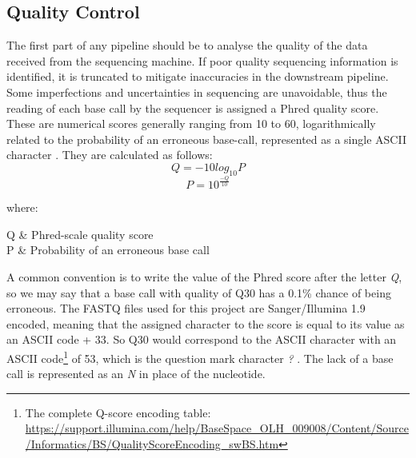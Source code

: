 \subsection{Quality Control}

The first part of any pipeline should be to analyse the quality of the data received from the sequencing machine. If poor quality sequencing information is identified, it is truncated to mitigate inaccuracies in the downstream pipeline. Some imperfections and uncertainties in sequencing are unavoidable, thus the reading of each base call by the sequencer is assigned a Phred quality score. These are numerical scores generally ranging from 10 to 60, logarithmically related to the probability of an erroneous base-call, represented as a single ASCII character \citep{ewing1998base}. They are calculated as follows:
$$ Q = -10 log_{10}P $$
 $$P = 10^{\frac{-Q}{10}}$$
 
where:
\begin{conditionsenv*}
	Q 		& Phred-scale quality score \\
	P 		& Probability of an erroneous base call \\
\end{conditionsenv*}

A common convention is to write the value of the Phred score after the letter \textit{Q}, so we may say that a base call with quality of Q30 has a 0.1\% chance of being erroneous. The FASTQ files used for this project are Sanger/Illumina 1.9 encoded, meaning that the assigned character to the score is equal to its value as an ASCII code + 33. So Q30 would correspond to the ASCII character with an ASCII code\footnote{The complete Q-score encoding table: \url{https://support.illumina.com/help/BaseSpace_OLH_009008/Content/Source/Informatics/BS/QualityScoreEncoding_swBS.htm}} of 53, which is the question mark character \textit{?} \citep{ewing1998base}. The lack of a base call is represented as an \textit{N} in place of the nucleotide.

